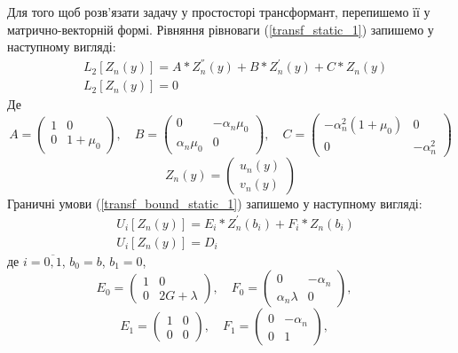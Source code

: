 Для того щоб розв'язати задачу у простосторі трансформант, перепишемо її у матрично-векторній формі.
Рівняння рівноваги (\ref{transf_static_1}) запишемо у наступному вигляді:
\begin{align}\label{transf_mat_static_1}
    &L_2\left[ Z_n(y) \right] = A * Z_n^{''}(y) + B * Z_n^{'}(y) + C * Z_n(y) \nonumber \\
    & L_2\left[ Z_n(y) \right] = 0
\end{align}
Де
\begin{equation*}
    A = \begin{pmatrix}
        1 & 0 \\
        0 & 1 + \mu_0
    \end{pmatrix}, \quad
    B = \begin{pmatrix}
        0 & -\alpha_n \mu_0 \\
        \alpha_n \mu_0 & 0
    \end{pmatrix}, \quad
    C = \begin{pmatrix}
        -\alpha_n^2(1 + \mu_0) & 0 \\
        0 & -\alpha_n^2
    \end{pmatrix}
\end{equation*}
\begin{equation*}
    Z_n(y) = \begin{pmatrix}
        u_n(y) \\
        v_n(y)
    \end{pmatrix}
\end{equation*}
Граничні умови (\ref{transf_bound_static_1}) запишемо у наступному вигляді:
\begin{align}\label{transf_bound_mat_static_1}
    &U_i\left[ Z_n(y) \right] = E_i * Z_n^{'}(b_i) + F_i * Z_n(b_i) \nonumber \\
    & U_i\left[ Z_n(y) \right] = D_i
\end{align}
де $i = \overline{0, 1}$, $b_0 = b$, $b_1 = 0$,
\begin{equation*}
    E_0 = \begin{pmatrix}
        1 & 0 \\
        0 & 2G + \lambda
    \end{pmatrix}, \quad
    F_0 = \begin{pmatrix}
        0 & -\alpha_n \\
        \alpha_n \lambda & 0
    \end{pmatrix}, \quad
\end{equation*}
\begin{equation*}
    E_1 = \begin{pmatrix}
        1 & 0 \\
        0 & 0
    \end{pmatrix}, \quad
    F_1 = \begin{pmatrix}
        0 & -\alpha_n \\
        0 & 1
    \end{pmatrix}, \quad
\end{equation*}
